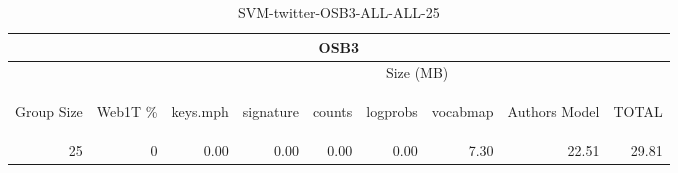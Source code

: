 \begin{center}
\begin{table}[htbp] 
 \begin{center}
\begin{tabular}{ | r | r | r | r | r | r | r | r | r |}
\hline
\multicolumn{9}{|c|}{OSB3}\\
\hline
 & & \multicolumn{7}{|c|}{Size (MB)}\\ \cline{3-9}
\begin{sideways}Group Size\end{sideways} & \begin{sideways}Web1T \% \end{sideways} & \begin{sideways}keys.mph\end{sideways} & \begin{sideways}signature\end{sideways} & \begin{sideways}counts\end{sideways} & \begin{sideways}logprobs\end{sideways} & \begin{sideways}vocabmap\end{sideways} & \begin{sideways}Authors Model \end{sideways} & \begin{sideways}TOTAL\end{sideways}\\
\hline
\multirow{0}{*}{25}
 & 0 & 0.00 & 0.00 & 0.00 & 0.00 & 7.30 & 22.51 & 29.81\\ \cline{2-9}
\hline
\end{tabular}
\caption{SVM-twitter-OSB3-ALL-ALL-25}
\label{table:SVM-twitter-OSB3-ALL-ALL-25}
\end{center}
 \end{table}
\end{center}

